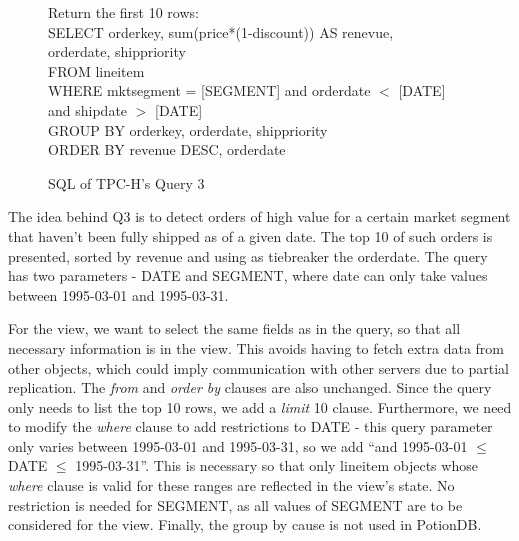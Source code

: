 \documentclass{vldb}
\begin{document}
\begin{figure}[h]
	Return the first 10 rows: \\
	SELECT orderkey, sum(price*(1-discount)) AS renevue, \\
	\hphantom{SELECT }orderdate, shippriority \\
	FROM lineitem \\
	WHERE mktsegment = [SEGMENT] and orderdate $<$ [DATE] and shipdate $>$ [DATE]\\
	GROUP BY orderkey, orderdate, shippriority \\
	ORDER BY revenue DESC, orderdate \\
\caption{SQL of TPC-H's Query 3}
\label{fig:q3}
\end{figure}


The idea behind Q3 is to detect orders of high value for a certain market segment that haven't been fully shipped as of a given date.
The top 10 of such orders is presented, sorted by revenue and using as tiebreaker the orderdate.
The query has two parameters - DATE and SEGMENT, where date can only take values between 1995-03-01 and 1995-03-31.

For the view, we want to select the same fields as in the query, so that all necessary information is in the view.
This avoids having to fetch extra data from other objects, which could imply communication with other servers due to partial replication.
The \emph{from} and \emph{order by} clauses are also unchanged. %
Since the query only needs to list the top 10 rows, we add a \emph{limit} 10 clause.
Furthermore, we need to modify the \emph{where} clause to add restrictions to DATE - this query parameter only varies between 1995-03-01 and 1995-03-31, so we add ``and 1995-03-01 $\leq$ DATE $\leq$ 1995-03-31''.
This is necessary so that only lineitem objects whose \emph{where} clause is valid for these ranges are reflected in the view's state.
No restriction is needed for SEGMENT, as all values of SEGMENT are to be considered for the view.
Finally, the group by cause is not used in PotionDB.
\end{document}
